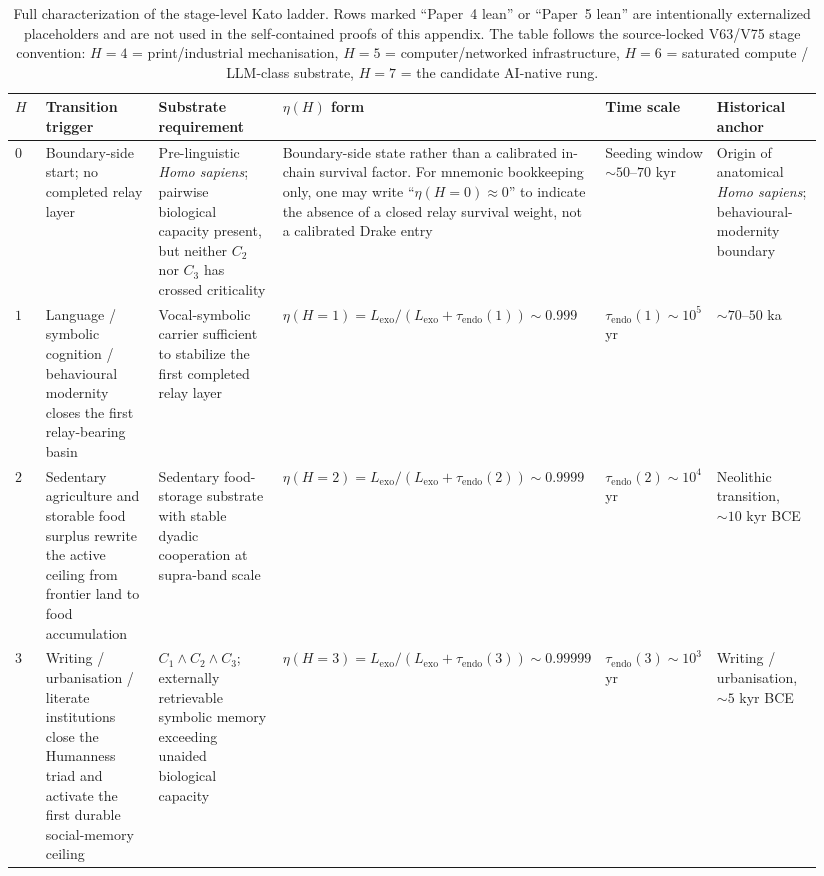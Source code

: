 \documentclass[11pt]{article}
\begin{document}
\begin{table}[t]
\centering
\scriptsize
\caption{Full characterization of the stage-level Kato ladder.
Rows marked ``Paper~4 lean'' or ``Paper~5 lean'' are intentionally
externalized placeholders and are not used in the self-contained proofs of
this appendix.  The table follows the source-locked V63/V75 stage convention:
$H{=}4$ = print/industrial mechanisation,
$H{=}5$ = computer/networked infrastructure,
$H{=}6$ = saturated compute / LLM-class substrate,
$H{=}7$ = the candidate AI-native rung.}
\label{tab:S-LadderFull}
\begin{tabular}{p{0.05\linewidth}p{0.18\linewidth}p{0.21\linewidth}p{0.20\linewidth}p{0.14\linewidth}p{0.16\linewidth}}
\toprule
$H$
& Transition trigger
& Substrate requirement
& $\eta(H)$ form
& Time scale
& Historical anchor \\
\midrule
$0$
& Boundary-side start; no completed relay layer
& Pre-linguistic \emph{Homo sapiens}; pairwise biological capacity present, but neither $C_2$ nor $C_3$ has crossed criticality
& Boundary-side state rather than a calibrated in-chain survival factor.  For mnemonic bookkeeping only, one may write ``$\eta(H{=}0)\approx 0$'' to indicate the absence of a closed relay survival weight, not a calibrated Drake entry
& Seeding window $\sim 50$--$70$ kyr
& Origin of anatomical \emph{Homo sapiens}; behavioural-modernity boundary \\

$1$
& Language / symbolic cognition / behavioural modernity closes the first relay-bearing basin
& Vocal-symbolic carrier sufficient to stabilize the first completed relay layer
& $\eta(H{=}1)=L_{\mathrm{exo}}/(L_{\mathrm{exo}}+\tau_{\mathrm{endo}}(1))\sim 0.999$
& $\tau_{\mathrm{endo}}(1)\sim 10^{5}$ yr
& $\sim 70$--$50$ ka \\

$2$
& Sedentary agriculture and storable food surplus rewrite the active ceiling from frontier land to food accumulation
& Sedentary food-storage substrate with stable dyadic cooperation at supra-band scale
& $\eta(H{=}2)=L_{\mathrm{exo}}/(L_{\mathrm{exo}}+\tau_{\mathrm{endo}}(2))\sim 0.9999$
& $\tau_{\mathrm{endo}}(2)\sim 10^{4}$ yr
& Neolithic transition, $\sim 10$ kyr BCE \\

$3$
& Writing / urbanisation / literate institutions close the Humanness triad and activate the first durable social-memory ceiling
& $C_1\wedge C_2\wedge C_3$;
externally retrievable symbolic memory exceeding unaided biological capacity
& $\eta(H{=}3)=L_{\mathrm{exo}}/(L_{\mathrm{exo}}+\tau_{\mathrm{endo}}(3))\sim 0.99999$
& $\tau_{\mathrm{endo}}(3)\sim 10^{3}$ yr
& Writing / urbanisation, $\sim 5$ kyr BCE \\


\end{tabular}
\end{table}
\end{document}
